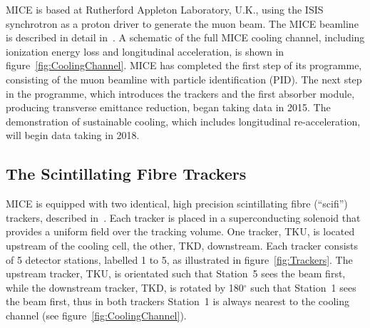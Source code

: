   MICE is based at Rutherford Appleton Laboratory, U.K., using the ISIS synchrotron as a proton driver to generate the muon beam.  The MICE beamline is described in detail in~\cite{MiceBeamline}. A schematic of the full MICE cooling channel, including ionization energy loss and longitudinal acceleration, is shown in figure~\ref{fig:CoolingChannel}.  MICE has completed the first step of its programme, consisting of the muon beamline with particle identification (PID). The next step in the programme, which introduces the trackers and the first absorber module, producing transverse emittance reduction, began taking data in 2015. The demonstration of sustainable cooling, which includes longitudinal re-acceleration, will begin data taking in 2018.


  \subsection{The Scintillating Fibre Trackers}
  \label{subsec:Trackers}
  MICE is equipped with two identical, high precision scintillating fibre (``scifi'') trackers, described in~\cite{MiceTrackers}. Each tracker is placed in a superconducting solenoid that provides a uniform field over the tracking volume. One tracker, TKU, is located upstream of the cooling cell, the other, TKD, downstream.  Each tracker consists of 5 detector stations, labelled 1 to 5, as illustrated in figure~\ref{fig:Trackers}. The upstream tracker, TKU, is orientated such that Station~5 sees the beam first, while the downstream tracker, TKD, is rotated by 180$^\circ$ such that Station~1 sees the beam first, thus in both trackers Station~1 is always nearest to the cooling channel (see figure~\ref{fig:CoolingChannel}).
  
